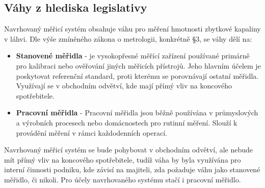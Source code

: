 \subsection{Váhy z hlediska legislativy}
Navrhovaný měřicí systém obsahuje váhu pro měření hmotnosti zbytkové kapaliny v láhvi. Dle výše zmíněného zákona o metrologii, konkrétně §3, se váhy dělí na:
\begin{itemize}
    \item \textbf{Stanovené měřidla} - je vysokopřesné měřící zařízení používané primárně pro kalibraci nebo ověřování jiných měřicích přístrojů. Jeho hlavním účelem je poskytovat referenční standard, proti kterému se porovnávají ostatní měřidla. Využívají se v obchodním odvětví, kde mají přímý vliv na koncového spotřebitele. \cite{Zákon o metrologii}
    \item \textbf{Pracovní měřidla} - Pracovní měřidla jsou běžně používána v průmyslových a výrobních procesech nebo domácnostech pro rutinní měření. Slouží k provádění měření v rámci každodenních operací. \cite{Zákon o metrologii}
\end{itemize}
\smallskip
Navrhovaný měřicí systém se bude pohybovat v obchodním odvětví, ale nebude mít přímý vliv na koncového spotřebitele, tudíž váha by byla využívána pro interní činnosti podniku, kde závisí na majiteli, zda požaduje váhu jako stanovené měřidlo, či nikoli. Pro účely navrhovaného systému stačí i pracovní měřidlo.\cite{použití elektronických vah v obchodním styku}

